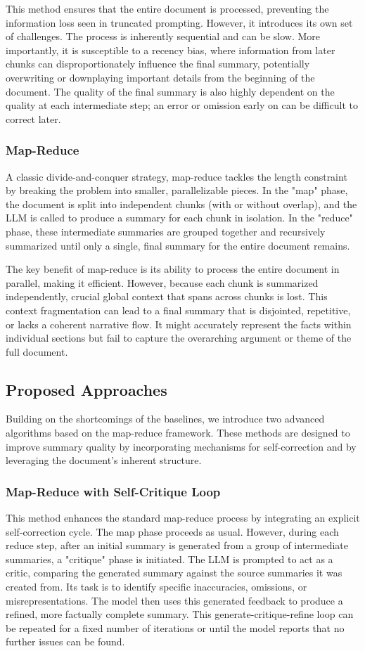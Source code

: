\documentclass[11pt]{article}
\begin{document}
This method ensures that the entire document is processed, preventing the information loss seen in truncated prompting. However, it introduces its own set of challenges. The process is inherently sequential and can be slow. More importantly, it is susceptible to a recency bias, where information from later chunks can disproportionately influence the final summary, potentially overwriting or downplaying important details from the beginning of the document. The quality of the final summary is also highly dependent on the quality at each intermediate step; an error or omission early on can be difficult to correct later.

\subsubsection{Map-Reduce}
A classic divide-and-conquer strategy, map-reduce tackles the length constraint by breaking the problem into smaller, parallelizable pieces. In the "map" phase, the document is split into independent chunks (with or without overlap), and the LLM is called to produce a summary for each chunk in isolation. In the "reduce" phase, these intermediate summaries are grouped together and recursively summarized until only a single, final summary for the entire document remains.

The key benefit of map-reduce is its ability to process the entire document in parallel, making it efficient. However, because each chunk is summarized independently, crucial global context that spans across chunks is lost. This context fragmentation can lead to a final summary that is disjointed, repetitive, or lacks a coherent narrative flow. It might accurately represent the facts within individual sections but fail to capture the overarching argument or theme of the full document.

\subsection{Proposed Approaches}
Building on the shortcomings of the baselines, we introduce two advanced algorithms based on the map-reduce framework. These methods are designed to improve summary quality by incorporating mechanisms for self-correction and by leveraging the document's inherent structure.

\subsubsection{Map-Reduce with Self-Critique Loop}
This method enhances the standard map-reduce process by integrating an explicit self-correction cycle. The map phase proceeds as usual. However, during each reduce step, after an initial summary is generated from a group of intermediate summaries, a "critique" phase is initiated. The LLM is prompted to act as a critic, comparing the generated summary against the source summaries it was created from. Its task is to identify specific inaccuracies, omissions, or misrepresentations. The model then uses this generated feedback to produce a refined, more factually complete summary. This generate-critique-refine loop can be repeated for a fixed number of iterations or until the model reports that no further issues can be found.
\end{document}
